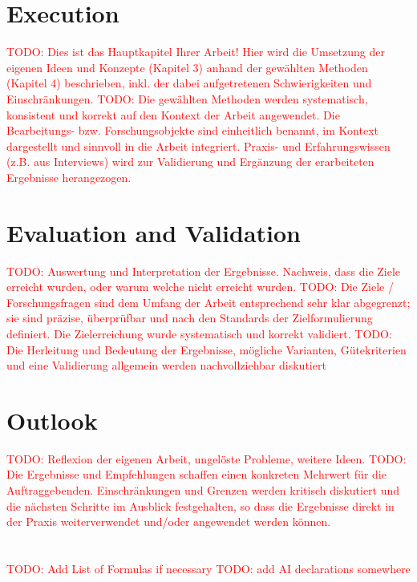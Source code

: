 \documentclass[12pt, a4paper, oneside]{book}   	%
\renewcommand{\todo}[1]{\textcolor{red}{TODO: #1}}
\begin{document}
	\chapter{Execution}
		\todo{Dies ist das Hauptkapitel Ihrer Arbeit! Hier wird die Umsetzung der eigenen Ideen und Konzepte (Kapitel 3) anhand der gewählten Methoden (Kapitel 4) beschrieben, inkl. der dabei aufgetretenen Schwierigkeiten und Einschränkungen.}
		\todo{Die gewählten Methoden werden systematisch, konsistent und korrekt auf den Kontext der Arbeit angewendet. Die Bearbeitungs- bzw. Forschungsobjekte sind einheitlich benannt, im Kontext dargestellt und sinnvoll in die Arbeit integriert. Praxis- und Erfahrungswissen (z.B. aus Interviews) wird zur Validierung und Ergänzung der erarbeiteten Ergebnisse herangezogen. }


	\chapter{Evaluation and Validation}
		\todo{Auswertung und Interpretation der Ergebnisse. Nachweis, dass die Ziele erreicht wurden, oder warum	welche nicht erreicht wurden.}
		\todo{Die Ziele / Forschungsfragen sind dem Umfang der Arbeit entsprechend sehr klar abgegrenzt; sie sind präzise, überprüfbar und nach den Standards der Zielformulierung definiert. Die Zielerreichung wurde systematisch und korrekt validiert.}
		\todo{Die Herleitung und Bedeutung der Ergebnisse, mögliche Varianten, Gütekriterien und eine Validierung allgemein werden nachvollziehbar diskutiert}
	
	\chapter{Outlook}
		\todo{Reflexion der eigenen Arbeit, ungelöste Probleme, weitere Ideen.}
		\todo{Die Ergebnisse und Empfehlungen schaffen einen konkreten Mehrwert für die Auftraggebenden. Einschränkungen und Grenzen werden kritisch diskutiert und die nächsten Schritte im Ausblick festgehalten, so dass die Ergebnisse direkt in der Praxis weiterverwendet und/oder angewendet werden können.}
		
		\newpage




	\chapter{\glossaryname}
	\todo{Add List of Formulas if necessary}
	\todo{add AI declarations somewhere}
	
\end{document}
